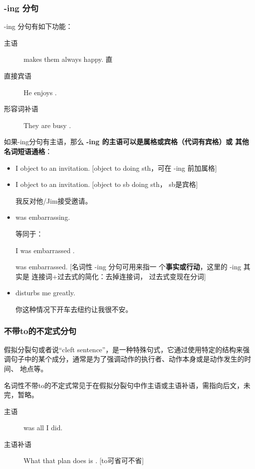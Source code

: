 \subsubsection{-ing 分句}

-ing 分句有如下功能：
\begin{description}
\item[主语]  makes them always happy.
  直
\item[直接宾语] He enjoys .

\item[形容词补语] They are busy .
\end{description}

如果-ing分句有主语，那么 \textbf{-ing 的主语可以是属格或宾格（代词有宾格）或
其他名词短语通格}：
\begin{itemize}
\item I object to  an invitation. [object to doing
  sth，可在 -ing 前加属格]
\item I object to  an invitation. [object to sb
  doing sth， sb是宾格]

  我反对他/Jim接受邀请。

\item {} was embarrassing.


  等同于：

  I was embarrassed .

   was embarrassed. [名词性 -ing 分句可用来指一
  个\textbf{事实或行动}，这里的 -ing 其实是 连接词+过去式的简化：去掉连接词，
  过去式变现在分词]

\item {} disturbs me greatly.

  你这种情况下开车去纽约让我很不安。

\end{itemize}

\subsubsection{不带to的不定式分句}

假拟分裂句或者说“cleft sentence”，是一种特殊句式，它通过使用特定的结构来强
调句子中的某个成分，通常是为了强调动作的执行者、动作本身或是动作发生的时间、
地点等。

名词性不带to的不定式常见于在假拟分裂句中作主语或主语补语，需指向后文，未完，暂略。
\begin{description}
\item[主语]  was all I did.
\item[主语补语] What that plan does is .
  [to可省可不省]
\end{description}

